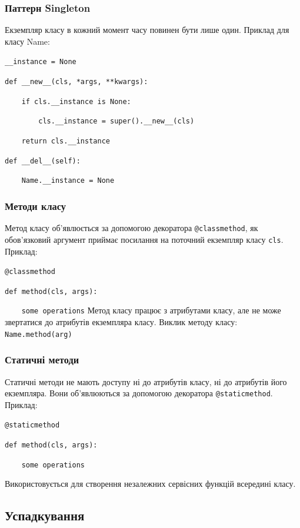 \begin{frame}
\frametitle{Паттерн Singleton}
Екземпляр класу в кожний момент часу повинен бути лише один. Приклад для класу Name:

\texttt{\_\_instance = None}
 
\texttt{def \_\_new\_\_(cls, *args, **kwargs):} 

\texttt{~~~~if cls.\_\_instance is None:} 

\texttt{~~~~~~~~cls.\_\_instance = super().\_\_new\_\_(cls)} 

\texttt{~~~~return cls.\_\_instance} 

\texttt{def \_\_del\_\_(self):} 

\texttt{~~~~Name.\_\_instance = None}

\end{frame}

\begin{frame}
\frametitle{Методи класу}

Метод класу об'явлюється за допомогою декоратора \texttt{@classmethod}, як обов'язковий аргумент приймає посилання на поточний екземпляр класу \texttt{cls}. Приклад:
\vspace{0.3cm}

\texttt{@classmethod}

\texttt{def method(cls, args):}

\texttt{~~~~some operations}
\vspace{0.3cm}
Метод класу працює з атрибутами класу, але не може звертатися до атрибутів екземпляра класу. Виклик методу класу: \texttt{Name.method(arg)}
\end{frame}

\begin{frame}
\frametitle{Статичні методи}
Статичні методи не мають доступу ні до атрибутів класу, ні до атрибутів його екземпляра. Вони об'явлюються за допомогою декоратора \texttt{@staticmethod}. Приклад:

\vspace{0.3cm}
\texttt{@staticmethod}

\texttt{def method(cls, args):}

\texttt{~~~~some operations}
\vspace{0.3cm}

Використовується для створення незалежних сервісних функцій всередині класу.  
\end{frame}




\subsection{Успадкування}
 
